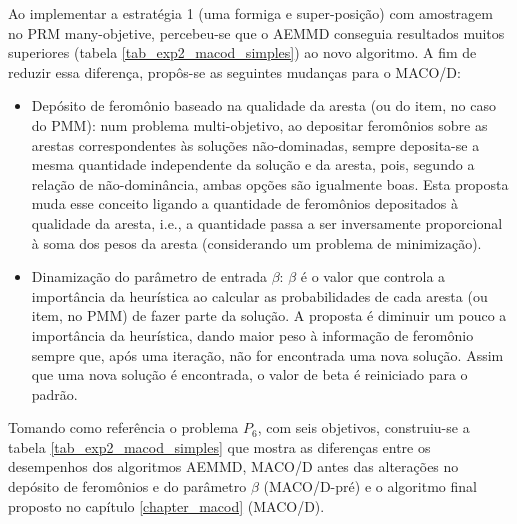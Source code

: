 Ao implementar a estratégia 1 (uma formiga e super-posição) com amostragem no PRM many-objetive, percebeu-se que o AEMMD conseguia resultados muitos superiores (tabela \ref{tab_exp2_macod_simples}) ao novo algoritmo. A fim de reduzir essa diferença, propôs-se as seguintes mudanças para o MACO/D:

\begin{itemize}
	\item Depósito de feromônio baseado na qualidade da aresta (ou do item, no caso do PMM): num problema multi-objetivo, ao depositar feromônios sobre as arestas correspondentes às soluções não-dominadas, sempre deposita-se a mesma quantidade independente da solução e da aresta, pois, segundo a relação de não-dominância, ambas opções são igualmente boas. Esta proposta muda esse conceito ligando a quantidade de feromônios depositados à qualidade da aresta, i.e., a quantidade passa a ser inversamente proporcional à soma dos pesos da aresta (considerando um problema de minimização).
	\item Dinamização do parâmetro de entrada $\beta$: $\beta$ é o valor que controla a importância da heurística ao calcular as probabilidades de cada aresta (ou item, no PMM) de fazer parte da solução. A proposta é diminuir um pouco a importância da heurística, dando maior peso à informação de feromônio sempre que, após uma iteração, não for encontrada uma nova solução. Assim que uma nova solução é encontrada, o valor de beta é reiniciado para o padrão.
\end{itemize}

Tomando como referência o problema $P_6$, com seis objetivos, construiu-se a tabela \ref{tab_exp2_macod_simples} que mostra as diferenças entre os desempenhos dos algoritmos AEMMD, MACO/D antes das alterações no depósito de feromônios e do parâmetro $\beta$ (MACO/D-pré) e o algoritmo final proposto no capítulo \ref{chapter_macod} (MACO/D).

